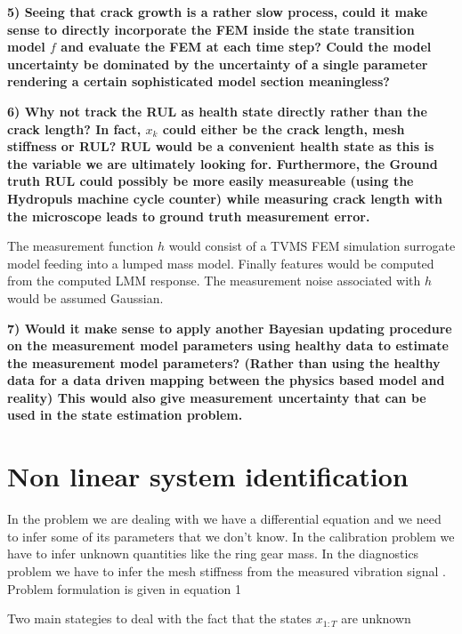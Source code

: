 \textbf{5) Seeing that crack growth is a rather slow process, could it make sense to directly incorporate the FEM inside the state transition model $f$ and evaluate the FEM at each time step? Could the model uncertainty be dominated by the uncertainty of a single parameter rendering a certain sophisticated model section meaningless?}

\textbf{6) Why not track the RUL as health state directly rather than the crack length? In fact, $x_{k}$ could either be the crack length, mesh stiffness or RUL? RUL would be a convenient health state as this is the variable we are ultimately looking for. Furthermore, the Ground truth RUL could possibly be more easily measureable (using the Hydropuls machine cycle counter) while measuring crack length with the microscope leads to ground truth measurement error.}


The measurement function $h$ would consist of a TVMS FEM simulation surrogate model feeding into a lumped mass model. Finally features would be computed from the computed LMM response. The measurement noise associated with $h$ would be assumed Gaussian. 

\textbf{7) Would it make sense to apply another Bayesian updating procedure on the measurement model parameters using healthy data to estimate the measurement model parameters? (Rather than using the healthy data for a data driven mapping between the physics based model and reality) This would also give measurement uncertainty that can be used in the state estimation problem.}

\section{Non linear system identification}

In the problem we are dealing with we have a differential equation and we need to infer some of its parameters that we don't know. In the calibration problem we have to infer unknown quantities like the ring gear mass. In the diagnostics problem we have to infer the mesh stiffness from the measured vibration signal
\cite{Schon2015}. Problem formulation is given in equation 1

Two main stategies to deal with the fact that the states $x_{1:T}$ are unknown


